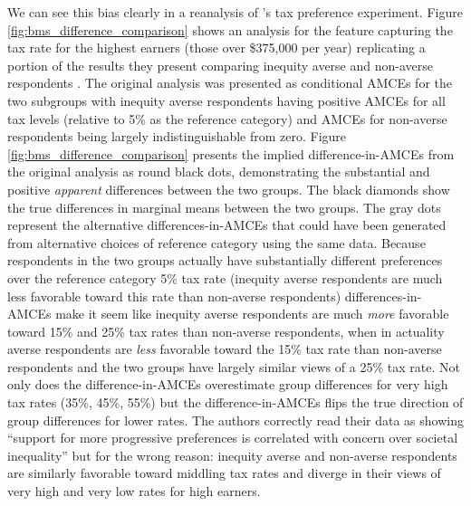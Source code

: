 \documentclass[a4paper,12pt]{article}\usepackage[]{graphicx}\usepackage[]{color}
\begin{document}
We can see this bias clearly in a reanalysis of \citeauthor{BallardRosaMartinScheve2016}'s tax preference experiment. Figure \ref{fig:bms_difference_comparison} shows an analysis for the feature capturing the tax rate for the highest earners (those over \$375,000 per year) replicating a portion of the results they present comparing inequity averse and non-averse respondents \citet[9 figure 2]{BallardRosaMartinScheve2016}. The original analysis was presented as conditional AMCEs for the two subgroups with inequity averse respondents having positive AMCEs for all tax levels (relative to 5\% as the reference category) and AMCEs for non-averse respondents being largely indistinguishable from zero. Figure \ref{fig:bms_difference_comparison} presents the implied difference-in-AMCEs from the original analysis as round black dots, demonstrating the substantial and positive \textit{apparent} differences between the two groups. The black diamonds show the true differences in marginal means between the two groups. The gray dots represent the alternative differences-in-AMCEs that could have been generated from alternative choices of reference category using the same data. Because respondents in the two groups actually have substantially different preferences over the reference category 5\% tax rate (inequity averse respondents are much less favorable toward this rate than non-averse respondents) differences-in-AMCEs make it seem like inequity averse respondents are much \textit{more} favorable toward 15\% and 25\% tax rates than non-averse respondents, when in actuality averse respondents are \textit{less} favorable toward the 15\% tax rate than non-averse respondents and the two groups have largely similar views of a 25\% tax rate. Not only does the difference-in-AMCEs overestimate group differences for very high tax rates (35\%, 45\%, 55\%) but the difference-in-AMCEs flips the true direction of group differences for lower rates. The authors correctly read their data as showing ``support for more progressive preferences is correlated with concern over societal inequality'' \citep[9]{BallardRosaMartinScheve2016} but for the wrong reason: inequity averse and non-averse respondents are similarly favorable toward middling tax rates and diverge in their views of very high and very low rates for high earners.
\end{document}
